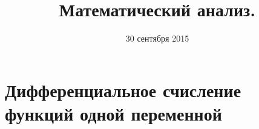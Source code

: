 \documentclass[11pt]{proc}
\title{Математический анализ.}
\date{30 сентября 2015}
\begin{document}
\maketitle

\section{Дифференциальное счисление функций одной переменной}
\end{document}
